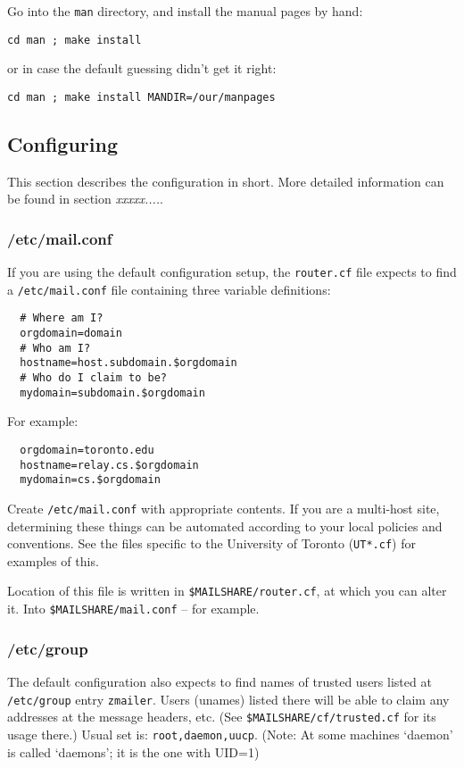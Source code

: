 Go into the {\tt man} directory, and install the manual pages by hand:
\begin{verbatim}
cd man ; make install
\end{verbatim}

or in case the default guessing didn't get it right:
\begin{verbatim}
cd man ; make install MANDIR=/our/manpages
\end{verbatim}



\subsection{Configuring}

This section describes the configuration in short. More detailed information 
can be found in section {\em xxxxx....\/}.


\subsubsection{/etc/mail.conf}

If you are using the default configuration setup, the {\tt router.cf} file
expects to find a {\tt /etc/mail.conf} file containing three variable
definitions:
\begin{verbatim}
  # Where am I?
  orgdomain=domain
  # Who am I?
  hostname=host.subdomain.$orgdomain
  # Who do I claim to be?
  mydomain=subdomain.$orgdomain
\end{verbatim}

For example:
\begin{verbatim}
  orgdomain=toronto.edu
  hostname=relay.cs.$orgdomain
  mydomain=cs.$orgdomain
\end{verbatim}

Create {\tt /etc/mail.conf} with appropriate contents.  If you are a
multi-host site, determining these things can be automated according
to your local policies and conventions.  See the files specific to
the University of Toronto ({\tt UT*.cf}) for examples of this.

Location of this file is written in {\tt \$MAILSHARE/router.cf}, at which
you can alter it. Into {\tt \$MAILSHARE/mail.conf} -- for example.


\subsubsection{/etc/group}

The default configuration also expects to find names of trusted users
listed at  {\tt /etc/group} entry {\tt zmailer}.  Users (unames) listed there
will be able to claim any addresses at the message headers, etc.
(See {\tt \$MAILSHARE/cf/trusted.cf} for its usage there.)
Usual set is: {\tt root,daemon,uucp}.
(Note: At some machines `daemon' is called `daemons'; it is
the one with UID=1)

